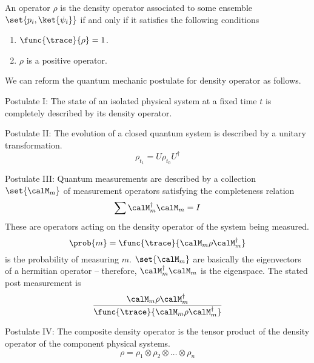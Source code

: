 \begin{theorem}
    An operator \(\rho\) is the density operator associated to some ensemble \(\set{p_i , \ket{\psi_i}}\) if and only if it satisfies the following conditions
    \begin{enumerate}
        \item \(\func{\trace}{\rho} = 1\).
        \item \(\rho\) is a positive operator.
    \end{enumerate}
\end{theorem}

We can reform the quantum mechanic postulate for density operator as follows.
\begin{definition}
    \item [Postulate I:] The state of an isolated physical system at a fixed time \(t\) is completely described by its density operator.
    \item [Postulate II:] The evolution of a closed quantum system is described by a unitary transformation.
    \begin{equation*}
        \rho_{t_1} = U \rho_{t_0} U^{\dagger}
    \end{equation*}
    
    \item [Postulate III:] Quantum measurements are described by a collection \(\set{\calM_m}\) of measurement operators satisfying the completeness relation
    \begin{equation*}
        \sum \calM_m^{\dagger} \calM_m = I
    \end{equation*}
    These are operators acting on the density operator of the system being measured.
    \begin{equation*}
        \prob{m} = \func{\trace}{\calM_m \rho \calM_m^{\dagger}}
    \end{equation*} 
    is the probability of measuring \(m\). \(\set{\calM_m}\) are basically the eigenvectors of a hermitian operator -- therefore, \(\calM_m^{\dagger} \calM_m \) is the eigenspace. The stated post measurement is 
    \begin{equation*}
        \dfrac{\calM_m \rho \calM_m^{\dagger}}{ \func{\trace}{\calM_m \rho \calM_m^{\dagger}}}
    \end{equation*}
    \item [Postulate IV:] The composite density operator is the tensor product of the density operator of the component physical  systems.
    \begin{equation*}
        \rho = \rho_1 \otimes \rho_2 \otimes \dots \otimes \rho_n
    \end{equation*}
\end{definition}

